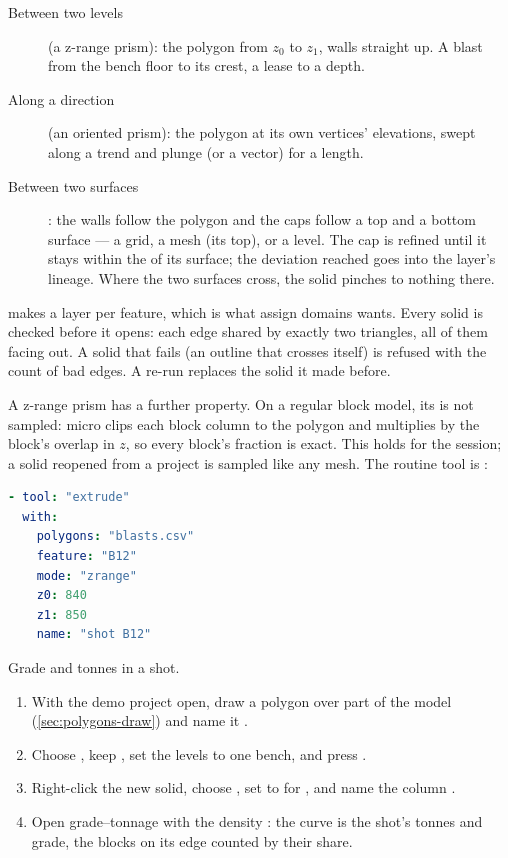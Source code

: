 \begin{description}
\item[Between two levels] (a z-range prism): the polygon from $z_0$ to $z_1$, walls straight up. A
  blast from the bench floor to its crest, a lease to a depth.
\item[Along a direction] (an oriented prism): the polygon at its own vertices' elevations, swept along
  a trend and plunge (or a vector) for a length.
\item[Between two surfaces]: the walls follow the polygon and the caps follow a top and a bottom
  surface --- a grid, a mesh (its top), or a level. The cap is refined until it stays within the
   of its surface; the deviation reached goes into the layer's lineage. Where the two
  surfaces cross, the solid pinches to nothing there.
\end{description}

 makes a layer per feature, which is what assign domains wants. Every solid is
checked before it opens: each edge shared by exactly two triangles, all of them facing out. A solid
that fails (an outline that crosses itself) is refused with the count of bad edges. A re-run replaces
the solid it made before.

A z-range prism has a further property. On a regular block model, its  is not
sampled: micro clips each block column to the polygon and multiplies by the block's overlap in $z$, so
every block's fraction is exact. This holds for the session; a solid reopened from a project is
sampled like any mesh. The routine tool is :

\begin{lstlisting}[language=yaml]
- tool: "extrude"
  with:
    polygons: "blasts.csv"
    feature: "B12"
    mode: "zrange"
    z0: 840
    z1: 850
    name: "shot B12"
\end{lstlisting}

\begin{tryit}
Grade and tonnes in a shot.
\begin{enumerate}
\item With the demo project open, draw a polygon over part of the model (\cref{sec:polygons-draw}) and
  name it .
\item Choose , keep , set the levels
  to one bench, and press .
\item Right-click the new solid, choose , set  to
   for , and name the column .
\item Open grade--tonnage with the density : the curve is the shot's tonnes and
  grade, the blocks on its edge counted by their share.
\end{enumerate}
\end{tryit}

